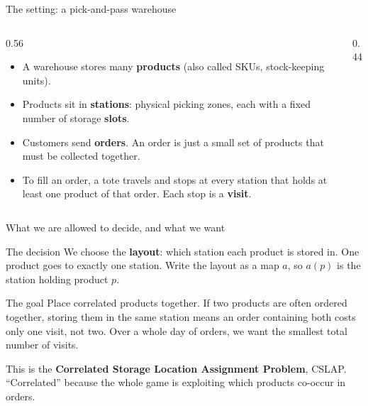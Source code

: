 \documentclass[11pt,aspectratio=169]{beamer}
\newcommand{\bd}[1]{\textcolor{bad}{#1}}
\newcommand{\term}[1]{\textcolor{blue!60!black}{\textbf{#1}}}
\begin{document}
\begin{frame}{The setting: a pick-and-pass warehouse}
  \begin{columns}
  \begin{column}{0.56\textwidth}
  \begin{itemize}
    \item A warehouse stores many \term{products} (also called SKUs, stock-keeping units).
    \item Products sit in \term{stations}: physical picking zones, each with a fixed number of storage \term{slots}.
    \item Customers send \term{orders}. An order is just a small set of products that must be collected together.
    \item To fill an order, a tote travels and stops at every station that holds at least one product of that order. Each stop is a \term{visit}.
  \end{itemize}
  \end{column}
  \begin{column}{0.44\textwidth}
  \centering
  \end{column}
  \end{columns}
\end{frame}

\begin{frame}{What we are allowed to decide, and what we want}
  \begin{block}{The decision}
  We choose the \term{layout}: which station each product is stored in. One product goes to exactly one station. Write the layout as a map $a$, so $a(p)$ is the station holding product $p$.
  \end{block}
  \begin{block}{The goal}
  Place correlated products together. If two products are often ordered together, storing them in the same station means an order containing both costs only one visit, not two. Over a whole day of orders, we want the \bd{smallest total number of visits}.
  \end{block}
  This is the \term{Correlated Storage Location Assignment Problem}, CSLAP. ``Correlated'' because the whole game is exploiting which products co-occur in orders.
\end{frame}
\end{document}
